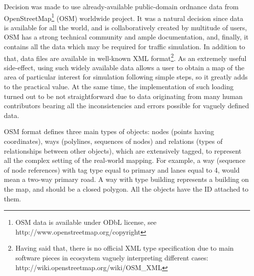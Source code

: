 Decision was made to use already-available public-domain ordnance data from OpenStreetMap\footnote{OSM data is available under ODbL license, see http://www.openstreetmap.org/copyright} (OSM)  worldwide project. It was a natural decision since data is available for all the world, and is collaboratively created by multitude of users, OSM has a strong technical community and ample documentation, and, finally, it contains all the data which may be required for traffic simulation. In addition to that, data files are available in well-known XML format\footnote{Having said that, there is no official XML type specification due to main software pieces in ecosystem vaguely interpreting different cases: http://wiki.openstreetmap.org/wiki/OSM\_XML}. As an extremely useful side-effect, using such widely available data allows a user to obtain a map of the area of particular interest for simulation following simple steps, so it greatly adds to the practical value. At the same time, the implementation of such loading turned out to be not straightforward due to data originating from many human contributors bearing all the inconsistencies and errors possible for vaguely defined data.

OSM format defines three main types of objects: nodes (points having coordinates), ways (polylines, sequences of nodes) and relations (types of relationships between other objects), which are extensively tagged, to represent all the complex setting of the real-world mapping. For example, a way (sequence of node references) with tag type equal to primary and lanes equal to 4, would mean a two-way primary road. A way with type building represents a building on the map, and should be a closed polygon. All the objects have the ID attached to them.


